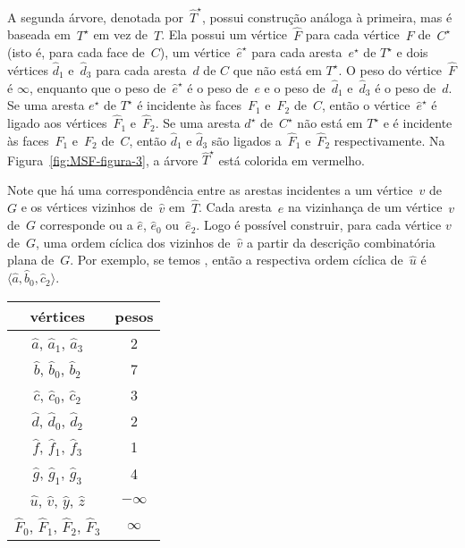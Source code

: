 A segunda árvore, denotada por~$\hat T^\star$, possui construção análoga à primeira, mas é baseada em~$T^\star$ em vez de~$T$.
Ela possui um vértice~$\hat F$ para cada vértice~$F$ de~$C^\star$ (isto é, para cada face de~$C$), um vértice~$\hat e^\star$ para cada aresta~$e^\star$ de $T^\star$ e dois vértices $\hat d_1$ e~$\hat d_3$ para cada aresta~$d$ de $C$ que não está em $T^\star$.
O peso do vértice~$\hat F$ é $\infty$, enquanto que o peso de~$\hat e^\star$ é o peso de~$e$ e o peso de~$\hat d_1$ e~$\hat d_3$ é o peso de~$d$.
Se uma aresta $e^\star$ de $T^\star$ é incidente às faces~$F_1$ e~$F_2$ de~$C$, então o vértice~$\hat e^\star$ é ligado aos vértices~$\hat F_1$ e~$\hat F_2$.
Se uma aresta $d^\star$ de~$C^\star$ não está em $T^\star$ e é incidente às faces~$F_1$ e~$F_2$ de~$C$, então $\hat d_1$ e $\hat d_3$ são ligados a~$\hat F_1$ e~$\hat F_2$ respectivamente.
Na Figura~\ref{fig:MSF-figura-3}, a árvore $\hat T^\star$ está colorida em vermelho.

Note que há uma correspondência entre as arestas incidentes a um vértice~$v$ de~$G$ e os vértices vizinhos de~$\hat v$ em~$\hat T$.
Cada aresta~$e$ na vizinhança de um vértice~$v$ de~$G$ corresponde ou a $\hat e$, $\hat e_0$ ou~$\hat e_2$. 
Logo é possível construir, para cada vértice $v$ de~$G$, uma ordem cíclica dos vizinhos de~$\hat v$ a partir da descrição combinatória plana de~$G$.
Por exemplo, se temos , então a respectiva ordem cíclica de~$\hat u$ é~$\langle \hat a, \hat b_0, \hat c_2 \rangle$.


\begin{minipage}[b]{0.4\textwidth}
\centering
\begin{tabular}{| c  c |} 
 \hline
 vértices & pesos\\
 \hline
 $\hat a$, $\hat a_1$, $\hat a_3$ & 2 \\ 
 \hline
 $\hat b$, $\hat b_0$, $\hat b_2$ & 7 \\
 \hline
 $\hat c$, $\hat c_0$, $\hat c_2$ & 3 \\
 \hline
 $\hat d$, $\hat d_0$, $\hat d_2$ & 2 \\
 \hline
 $\hat f$, $\hat f_1$, $\hat f_3$ & 1 \\
 \hline
 $\hat g$, $\hat g_1$, $\hat g_3$ & 4 \\
 \hline
 $\hat u$, $\hat v$, $\hat y$, $\hat z$ & $-\infty$ \\
 \hline
 $\hat F_0$, $\hat F_1$, $\hat F_2$, $\hat F_3$ & $\infty$ \\
 \hline
\end{tabular}
\end{minipage}
\hfill
\begin{minipage}[b]{0.5\textwidth}
    \centering

\label{fig:MSF-figura-3}
    \end{minipage}

